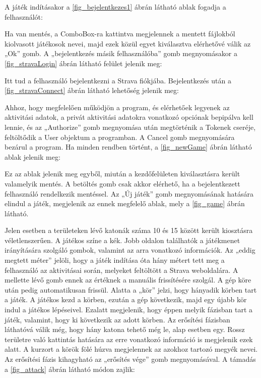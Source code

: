 A játék indításakor a \ref{fig_bejelentkezes1} ábrán látható ablak fogadja a felhasználót: 


%



Ha van mentés, a ComboBox-ra kattintva megjelennek a mentett fájlokból kiolvasott játékosok nevei, majd ezek közül egyet kiválasztva elérhetővé válik az „Ok” gomb. A „bejelentkezés másik felhasználóba” gomb megnyomásakor a \ref{fig_stravaLogin} ábrán látható felület jelenik meg: 



Itt tud a felhasználó bejelentkezni a Strava fiókjába. Bejelentkezés után a \ref{fig_stravaConnect} ábrán látható lehetőség jelenik meg: 




Ahhoz, hogy megfelelően működjön a program, és elérhetőek legyenek az aktivitási adatok, a privát aktivitási adatokra vonatkozó opciónak bepipálva kell lennie, és az „Authorize” gomb megnyomása után megtörténik a Tokenek cseréje, feltöltődik a User objektum a programban. A Cancel gomb megnyomására bezárul a program. Ha minden rendben történt, a \ref{fig_newGame} ábrán látható ablak jelenik meg: 



Ez az ablak jelenik meg egyből, miután a kezdőfelületen kiválasztásra került valamelyik mentés. A betöltés gomb csak akkor elérhető, ha a bejelentkezett felhasználó rendelkezik mentéssel. Az „Új játék” gomb megnyomásának hatására elindul a játék, megjelenik az ennek megfelelő ablak, mely a \ref{fig_game} ábrán látható. 


Jelen esetben a területeken lévő katonák száma 10 és 15 között került kiosztásra véletlenszerűen. A játékos színe a kék. Jobb oldalon találhatók a játékmenet irányítására szolgáló gombok, valamint az arra vonatkozó információk. Az „eddig megtett méter” jelöli, hogy a játék indítása óta hány métert tett meg a felhasználó az aktivitásai során, melyeket feltöltött a Strava weboldalára. A mellette lévő gomb ennek az értéknek a manuális frissítésére szolgál. A gép köre után pedig automatikusan frissül. Alatta a „kör” jelzi, hogy hányadik körben tart a játék. A játékos kezd a körben, ezután a gép következik, majd egy újabb kör indul a játékos lépéseivel. Ezalatt megjelenik, hogy éppen melyik fázisban tart a játék, valamint, hogy ki következik az adott körben. Az erősítési fázisban láthatóvá válik még, hogy hány katona tehető még le, alap esetben egy. Rossz területre való kattintás hatására az erre vonatkozó információ is megjelenik ezek alatt. A kurzort a körök fölé húzva megjelennek az azokhoz tartozó megyék nevei. Az erősítési fázis kihagyható az „erősítés vége” gomb megnyomásával. A támadás a \ref{fig_attack} ábrán látható módon zajlik: 

